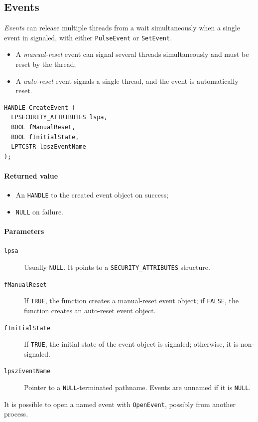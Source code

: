 \subsection{Events}
\emph{Events} can release multiple threads from a wait simultaneously when a single event in signaled, with either \texttt{PulseEvent} or \texttt{SetEvent}.

\begin{itemize}
\item A \emph{manual-reset} event can signal several threads simultaneously and must be reset by the thread;
\item A \emph{auto-reset} event signals a single thread, and the event is automatically reset.
\end{itemize}

\begin{verbatim}
HANDLE CreateEvent (
  LPSECURITY_ATTRIBUTES lspa,
  BOOL fManualReset,
  BOOL fInitialState,
  LPTCSTR lpszEventName
);
\end{verbatim}

\paragraph{Returned value}
\begin{itemize}
\item An \texttt{HANDLE} to the created event object on success;
\item \texttt{NULL} on failure.
\end{itemize}

\paragraph{Parameters}
\begin{description}
\item [\texttt{lpsa}] Usually \texttt{NULL}. It points to a \texttt{SECURITY\_ATTRIBUTES} structure.
\item [\texttt{fManualReset}] If \texttt{TRUE}, the function creates a manual-reset event object; if \texttt{FALSE}, the function creates an auto-reset event object.
\item [\texttt{fInitialState}] If \texttt{TRUE}, the initial state of the event object is signaled; otherwise, it is non-signaled.
\item [\texttt{lpszEventName}] Pointer to a \texttt{NULL}-terminated pathname. Events are unnamed if it is \texttt{NULL}.
\end{description}
It is possible to open a named event with \texttt{OpenEvent}, possibly from another process.

